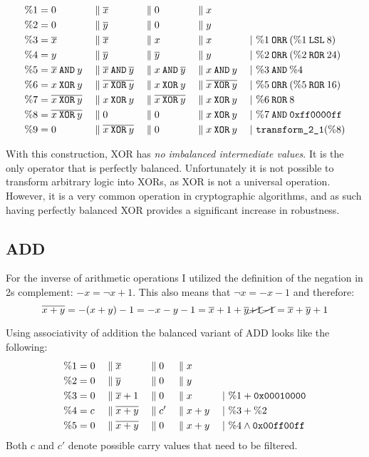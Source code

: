 \begin{align*}
  \binp{1}{0}{\neg{x}}{0}{x}\\
  \binp{2}{0}{\neg{y}}{0}{y}\\
  \btrans{3}{\neg{x}}{\neg{x}}{x}{x}{\%1 \borr (\%1 \blsl 8)}\\
  \btrans{4}{y}{\neg{y}}{\neg{y}}{y}{\%2 \borr (\%2 \bror 24)}\\
  \btrans{5}{\neg{x} \band y}{\neg{x} \band \neg{y}}{x \band \neg{y}}{x \band y}{\%3 \band \%4}\\
  \btrans{6}{x \bxor y}{\neg{x \bxor y}}{x \bxor y}{\neg{x \bxor y}}{\%5 \borr (\%5 \bror 16)}\\
  \btrans{7}{\neg{x \bxor y}}{x \bxor y}{\neg{x \bxor y}}{x \bxor y}{\%6 \bror 8}\\
  \btrans{8}{\neg{x \bxor y}}{0}{0}{x \bxor y}{\%7 \band \hex{ff0000ff}}\\
  \btrans{9}{0}{\neg{x \bxor y}}{0}{x \bxor y}{\trans21 (\%8)}
\end{align*}

With this construction, XOR has \emph{no imbalanced intermediate values}.
It is the only operator that is perfectly balanced.
Unfortunately it is not possible to transform arbitrary logic into XORs, as XOR is not a universal operation.
However, it is a very common operation in cryptographic algorithms, and as such having perfectly balanced XOR provides a significant increase in robustness.

\subsection{ADD}
For the inverse of arithmetic operations I utilized the definition of the negation in 2s complement: $-x = \neg{x} + 1$.
This also means that $\neg{x} = -x - 1$ and therefore:
\begin{equation*}
  \neg{x + y} = - (x + y) - 1 = - x - y - 1 = \neg{x} + 1 + \neg{y} \cancel{+ 1} \cancel{- 1} = \neg{x} + \neg{y} + 1
\end{equation*}

Using associativity of addition the balanced variant of ADD looks like the following:
\begin{align*}
  \%1 &= 0 && \bsep \neg{x} &&\bsep 0 &&\bsep x      &&\\
  \%2 &= 0 && \bsep \neg{y} &&\bsep 0 &&\bsep y      &&\\
  \%3 &= 0 && \bsep \neg{x}+1 &&\bsep 0 &&\bsep x    &&\;|\ \%1 + \hex{00010000}\\
  \%4 &= c && \bsep \neg{x+y} &&\bsep c' &&\bsep x+y &&\;|\ \%3 + \%2\\
  \%5 &= 0 && \bsep \neg{x+y} &&\bsep 0 &&\bsep x+y  &&\;|\ \%4 \land \hex{00ff00ff}
\end{align*}
Both $c$ and $c'$ denote possible carry values that need to be filtered.

